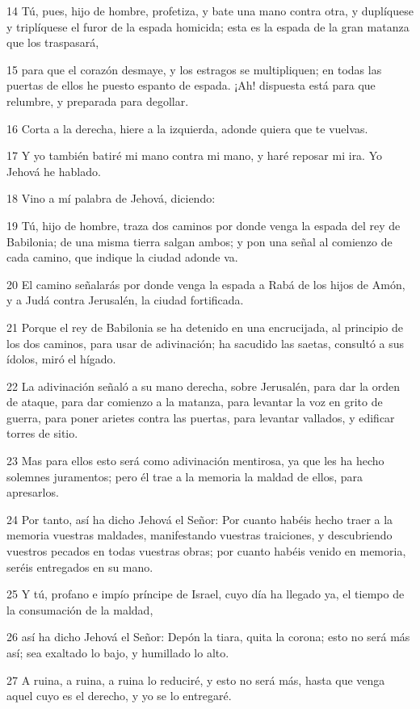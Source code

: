 \par 14 Tú, pues, hijo de hombre, profetiza, y bate una mano contra otra, y duplíquese y triplíquese el furor de la espada homicida; esta es la espada de la gran matanza que los traspasará,
\par 15 para que el corazón desmaye, y los estragos se multipliquen; en todas las puertas de ellos he puesto espanto de espada. ¡Ah! dispuesta está para que relumbre, y preparada para degollar.
\par 16 Corta a la derecha, hiere a la izquierda, adonde quiera que te vuelvas.
\par 17 Y yo también batiré mi mano contra mi mano, y haré reposar mi ira. Yo Jehová he hablado.
\par 18 Vino a mí palabra de Jehová, diciendo:
\par 19 Tú, hijo de hombre, traza dos caminos por donde venga la espada del rey de Babilonia; de una misma tierra salgan ambos; y pon una señal al comienzo de cada camino, que indique la ciudad adonde va.
\par 20 El camino señalarás por donde venga la espada a Rabá de los hijos de Amón, y a Judá contra Jerusalén, la ciudad fortificada.
\par 21 Porque el rey de Babilonia se ha detenido en una encrucijada, al principio de los dos caminos, para usar de adivinación; ha sacudido las saetas, consultó a sus ídolos, miró el hígado.
\par 22 La adivinación señaló a su mano derecha, sobre Jerusalén, para dar la orden de ataque, para dar comienzo a la matanza, para levantar la voz en grito de guerra, para poner arietes contra las puertas, para levantar vallados, y edificar torres de sitio.
\par 23 Mas para ellos esto será como adivinación mentirosa, ya que les ha hecho solemnes juramentos; pero él trae a la memoria la maldad de ellos, para apresarlos.
\par 24 Por tanto, así ha dicho Jehová el Señor: Por cuanto habéis hecho traer a la memoria vuestras maldades, manifestando vuestras traiciones, y descubriendo vuestros pecados en todas vuestras obras; por cuanto habéis venido en memoria, seréis entregados en su mano.
\par 25 Y tú, profano e impío príncipe de Israel, cuyo día ha llegado ya, el tiempo de la consumación de la maldad,
\par 26 así ha dicho Jehová el Señor: Depón la tiara, quita la corona; esto no será más así; sea exaltado lo bajo, y humillado lo alto.
\par 27 A ruina, a ruina, a ruina lo reduciré, y esto no será más, hasta que venga aquel cuyo es el derecho, y yo se lo entregaré.

